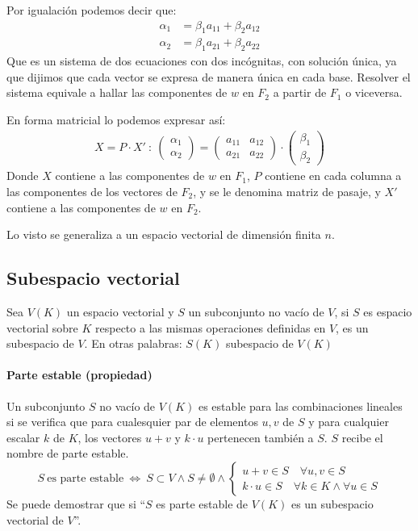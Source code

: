 Por igualación podemos decir que:
\begin{align*}
  \alpha_1 &= \beta_1 a_{11} + \beta_2 a_{12} \\ 
  \alpha_2 &= \beta_1 a_{21} + \beta_2 a_{22}
\end{align*}
Que es un sistema de dos ecuaciones con dos incógnitas, con solución única, ya que dijimos que cada vector se expresa de manera única en cada base. Resolver el sistema equivale a hallar las componentes de \(w\) en \(F_2\) a partir de \(F_1\) o viceversa.

En forma matricial lo podemos expresar así:
\begin{align*}
  X = P \cdot X' ~ : ~ \begin{pmatrix}
    \alpha_1 \\ \alpha_2
  \end{pmatrix} = \begin{pmatrix}
    a_{11} & a_{12} \\ 
    a_{21} & a_{22}
  \end{pmatrix} \cdot \begin{pmatrix}
    \beta_1 \\ \beta_2
  \end{pmatrix}
\end{align*}
Donde \(X\) contiene a las componentes de \(w\) en \(F_1\), \(P\) contiene en cada columna a las componentes de los vectores de \(F_2\), y se le denomina matriz de pasaje, y \(X'\) contiene a las componentes de \(w\) en \(F_2\).

Lo visto se generaliza a un espacio vectorial de dimensión finita \(n\).

\subsection{Subespacio vectorial}

Sea \(V(K)\) un espacio vectorial y \(S\) un subconjunto no vacío de \(V\), si \(S\) es espacio vectorial sobre \(K\) respecto a las mismas operaciones definidas en \(V\), es un subespacio de \(V\). En otras palabras: \(S(K)\) subespacio de \(V(K)\)

\paragraph{Parte estable (propiedad)}

Un subconjunto \(S\) no vacío de \(V(K)\) es estable para las combinaciones lineales si se verifica que para cualesquier par de elementos \(u,v\) de \(S\) y para cualquier escalar \(k\) de \(K\), los vectores \(u+v\) y \(k\cdot u\) pertenecen también a \(S\). \(S\) recibe el nombre de parte estable.
\[
  S ~ \text{es parte estable} ~ \Longleftrightarrow ~ S \subset V \land S \neq \emptyset \land \begin{cases}
    u + v \in S \quad \forall u, v \in S\\
    k \cdot u \in S \quad \forall k \in K \land \forall u \in S
  \end{cases}
\]
Se puede demostrar que si ``\(S\) es parte estable de \(V(K)\) es un subespacio vectorial de \(V\)''.

